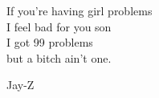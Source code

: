 \epigraph{If you're having girl problems \\
          I feel bad for you son \\
          I got 99 problems \\
          but a bitch ain't one.}{Jay-Z}